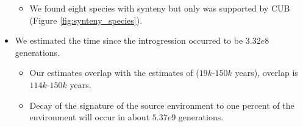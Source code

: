 \documentclass[12pt]{article}
\begin{document}
\begin{itemize}
\begin{itemize}
		\item We found eight species with synteny but only \gossypii was supported by CUB (Figure \ref{fig:synteny_species}).
	\end{itemize}
	\item We estimated the time since the introgression occurred to be $3.32e8$ generations.
	\begin{itemize}
		\item Our estimates overlap with the estimates of \citep{friedrich2015} ($19k$-$150k$ years), overlap is $114k$-$150k$ years.
		\item Decay of the signature of the source environment to one percent of the \kluyveri environment will occur in about $5.37e9$ generations.
	\end{itemize}
\end{itemize}
\end{document}
